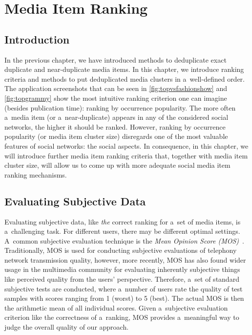 \chapter{Media Item Ranking}
\label{cha:media-item-ranking}

\ifpdf
    \graphicspath{{8_media_item_ranking/figures/PNG/}{8_media_item_ranking/figures/PDF/}{8_media_item_ranking/figures/}}
\else
    \graphicspath{{8_media_item_ranking/figures/EPS/}{8_media_item_ranking/figures/}}
\fi

\section{Introduction}

In the previous chapter, we have introduced methods
to deduplicate exact duplicate and near-duplicate media items.
In this chapter, we introduce ranking criteria and methods
to put deduplicated media clusters in a~well-defined order.
The application screenshots that can be seen in \autoref{fig:topvsfashionshow}
and \autoref{fig:topgrammy} show the
most intuitive ranking criterion one can imagine (besides publication time):
ranking by occurrence popularity.
The more often a~media item (or a~near-duplicate)
appears in any of the considered social networks, 
the higher it should be ranked.
However, ranking by occurrence popularity (or media item cluster size)
disregards one of the most valuable features of social networks: 
the social aspects.
In consequence, in this chapter, we will introduce
further media item ranking criteria that,
together with media item cluster size,
will allow us to come up with more adequate social media item ranking mechanisms.

\section{Evaluating Subjective Data}

Evaluating subjective data, like \emph{the} correct ranking
for a~set of media items, is a~challenging task.
For different users, there may be different optimal settings.
A~common subjective evaluation technique
is the \emph{Mean Opinion Score (MOS)}~\cite{itu1998mos}.
Traditionally, MOS is used for conducting subjective evaluations
of telephony network transmission quality,
however, more recently, MOS has also found
wider usage in the multimedia community
for evaluating inherently subjective things
like perceived quality from the users' perspective. 
Therefore, a~set of standard subjective tests are conducted,
where a~number of users rate the quality of test samples
with scores ranging from 1 (worst) to 5 (best).
The actual MOS is then the arithmetic mean of all individual scores.
Given a~subjective evaluation criterion
like the correctness of a~ranking,
MOS provides a~meaningful way to judge the overall quality of our approach.

